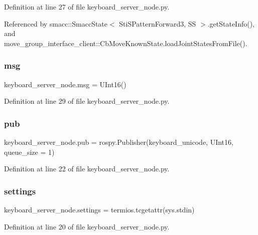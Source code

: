 Definition at line 27 of file keyboard\+\_\+server\+\_\+node.\+py.



Referenced by smacc\+::\+Smacc\+State$<$ Sti\+S\+Pattern\+Forward3, S\+S $>$.\+get\+State\+Info(), and move\+\_\+group\+\_\+interface\+\_\+client\+::\+Cb\+Move\+Known\+State.\+load\+Joint\+States\+From\+File().

\mbox{\label{namespacekeyboard__server__node_a555024e72f3e57503b0eebad2546fc72}} 
\subsubsection{\texorpdfstring{msg}{msg}}
{\footnotesize\ttfamily keyboard\+\_\+server\+\_\+node.\+msg = U\+Int16()}



Definition at line 29 of file keyboard\+\_\+server\+\_\+node.\+py.

\mbox{\label{namespacekeyboard__server__node_acb9a153a1e2ddb5dab254f49ade8512e}} 
\subsubsection{\texorpdfstring{pub}{pub}}
{\footnotesize\ttfamily keyboard\+\_\+server\+\_\+node.\+pub = rospy.\+Publisher(\textquotesingle{}keyboard\+\_\+unicode\textquotesingle{}, U\+Int16, queue\+\_\+size = 1)}



Definition at line 22 of file keyboard\+\_\+server\+\_\+node.\+py.

\mbox{\label{namespacekeyboard__server__node_ade1a45e58d917f8cdb07d1d54ac6bd34}} 
\subsubsection{\texorpdfstring{settings}{settings}}
{\footnotesize\ttfamily keyboard\+\_\+server\+\_\+node.\+settings = termios.\+tcgetattr(sys.\+stdin)}



Definition at line 20 of file keyboard\+\_\+server\+\_\+node.\+py.

